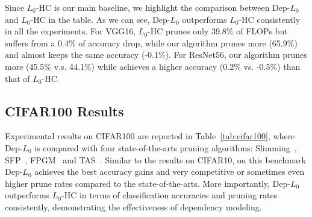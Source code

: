 \documentclass[runningheads, envcountsame, a4paper]{llncs}
\begin{document}
Since $L_0$-HC is our main baseline, we highlight the comparison between Dep-$L_0$ and $L_0$-HC in the table. As we can see, Dep-$L_0$ outperforms $L_0$-HC consistently in all the experiments. For VGG16, $L_0$-HC prunes only 39.8\% of FLOPs but suffers from a 0.4\% of accuracy drop, while our algorithm prunes more (65.9\%) and almost keeps the same accuracy (-0.1\%). For ResNet56, our algorithm prunes more (45.5\% v.s. 44.1\%) while achieves a higher accuracy (0.2\% vs. -0.5\%) than that of $L_0$-HC. 

\subsection{CIFAR100 Results}
Experimental results on CIFAR100 are reported in Table~\ref{tab:cifar100}, where Dep-$L_0$ is compared with four state-of-the-arts pruning algorithms: Slimming~\cite{liu2017learning}, SFP~\cite{he2018soft}, FPGM~\cite{he2019filter} and TAS~\cite{dong2019network}. Similar to the results on CIFAR10, on this benchmark Dep-$L_0$ achieves the best accuracy gains and very competitive or sometimes even higher prune rates compared to the state-of-the-arts. More importantly, Dep-$L_0$ outperforms $L_0$-HC in terms of classification accuracies and pruning rates consistently, demonstrating the effectiveness of dependency modeling.
\end{document}
